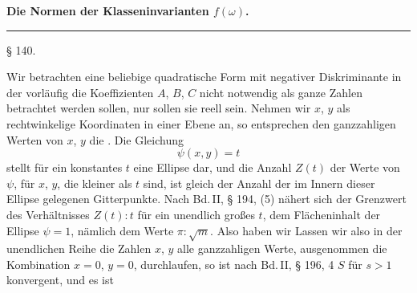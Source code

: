 
\begin{center}

\textbf{Die Normen der Klasseninvarianten $f(\omega)$.}

\rule{0.3\linewidth}{0.4pt}
\end{center}

\begin{center}
§ 140. 
\end{center}

Wir betrachten eine beliebige quadratische Form
mit negativer Diskriminante
in der vorläufig die Koeffizienten $A$, $B$, $C$ nicht notwendig als ganze Zahlen betrachtet werden sollen, nur sollen sie reell sein. Nehmen wir $x$, $y$ als rechtwinkelige Koordinaten in einer Ebene an, so entsprechen den ganzzahligen Werten von $x$, $y$ die . Die Gleichung
\[\psi(x,y) = t\]
stellt für ein konstantes $t$ eine Ellipse dar, und die Anzahl $Z(t)$ der Werte von $\psi$, für  $x$, $y$, die kleiner als $t$ sind, ist gleich der Anzahl der im Innern dieser Ellipse gelegenen Gitterpunkte. Nach Bd.\,II, § 194, (5) nähert sich der Grenzwert des Verhältnisses $Z(t):t$ für ein unendlich großes $t$, dem Flächeninhalt der Ellipse $\psi = 1$, nämlich dem Werte $\pi:\sqrt{m}$. Also haben wir
Lassen wir also in der unendlichen Reihe
die Zahlen $x$, $y$ alle ganzzahligen Werte, ausgenommen die Kombination $x=0$, $y=0$, durchlaufen, so ist nach Bd.\,II, § 196, 4 $S$ für $s>1$ konvergent, und es ist
